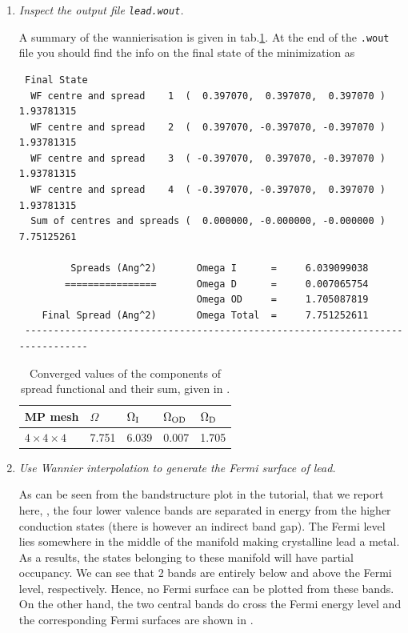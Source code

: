 \begin{enumerate}
\item {\it Inspect the output file {\tt lead.wout}.}

A summary of the wannierisation is given in tab.\ref{tab2.1}. At the end of the {\tt .wout} file you should find the info on the final state of the minimization as
\begin{tcolorbox}[sharp corners,boxrule=0.5pt]
{\small
\begin{verbatim}
 Final State
  WF centre and spread    1  (  0.397070,  0.397070,  0.397070 )     1.93781315
  WF centre and spread    2  (  0.397070, -0.397070, -0.397070 )     1.93781315
  WF centre and spread    3  ( -0.397070,  0.397070, -0.397070 )     1.93781315
  WF centre and spread    4  ( -0.397070, -0.397070,  0.397070 )     1.93781315
  Sum of centres and spreads (  0.000000, -0.000000, -0.000000 )     7.75125261
 
         Spreads (Ang^2)       Omega I      =     6.039099038
        ================       Omega D      =     0.007065754
                               Omega OD     =     1.705087819
    Final Spread (Ang^2)       Omega Total  =     7.751252611
 ------------------------------------------------------------------------------
\end{verbatim}
}
\end{tcolorbox}


\begin{table}[h!]
\centering
\caption{Converged values of the components of spread functional and their sum, given in \angsqd{}.}
\begin{tabular}{@{} lllll @{}}\toprule[1.5pt]
MP mesh & $\Omega$ & $\Omega\tinysub{I}$ & $\Omega\tinysub{OD}$ & $\Omega\tinysub{D}$ \\\midrule
$4\times4\times4$ & 7.751 &6.039 & 0.007 & 1.705 \\\bottomrule[1pt]
\end{tabular}\label{tab2.1}
\end{table}

\item {\it Use Wannier interpolation to generate the Fermi surface of lead.}

As can be seen from the bandstructure plot in the \Wannier{} tutorial, that we report here, \cf{} , the four lower valence bands are separated in energy from the higher conduction states (there is however an indirect band gap). The Fermi level lies somewhere in the middle of the manifold making crystalline lead a metal. As a results, the states belonging to these manifold will have partial occupancy. 
We can see that 2 bands are entirely below and above the Fermi level, respectively. Hence, no Fermi surface can be plotted from these bands. On the other hand, the two central bands do cross the Fermi energy level and the corresponding Fermi surfaces are shown in .  


\end{enumerate}
